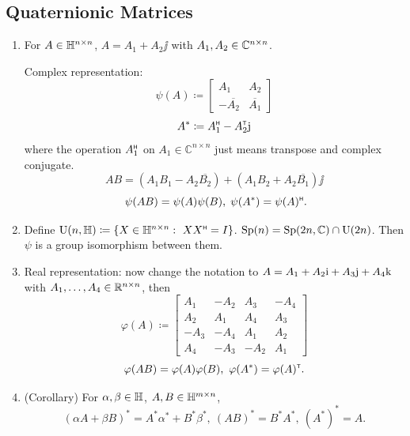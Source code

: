 \subsection{Quaternionic Matrices}
\label{sec:quaternionic-matrices}
\begin{enumerate}
    \item For $A \in \mathbb{H}^{n\times n}$, $A=A_1+A_2\jj$ with $A_1, A_2 \in \mathbb{C}^{n\times n}$.
    
    Complex representation:
        \[ \psi(A) \coloneqq \begin{bmatrix}
        A_1 & A_2 \\ -\overline{A_2} & \overline{A_1}
    \end{bmatrix} \]
        \[ A^* \coloneqq A_1^{\scriptscriptstyle\mathsf{H}} - A_2^{\scriptscriptstyle\mathsf{T}} {\mathrm{j}} \]
    where the operation $A_1^{\scriptscriptstyle\mathsf{H}}$ on $A_1 \in \mathbb{C}^{n\times n}$ just means transpose and complex conjugate.
        \[ AB = (A_1B_1 - A_2 \overline{B_2}) + (A_1B_2 + A_2 \overline{B_1})\jj \]
        \[ \ \psi(AB)=\psi(A) \psi(B), \; \psi(A^*)= \psi(A)^{\scriptscriptstyle\mathsf{H}}. \]
    \item Define $\operatorname{U}(n, \mathbb{H})\coloneqq \{ X \in \mathbb{H}^{n\times n}: \ XX^{\scriptscriptstyle\mathsf{H}}=I \}$. $\operatorname{Sp}(n)=\operatorname{Sp}(2n, \mathbb{C}) \cap \operatorname{U}(2n)$.
    Then $\psi$ is a group isomorphism between them.
    \item Real representation: now change the notation to $A=A_1+A_2{\mathrm{i}}+A_3{\mathrm{j}} + A_4{\mathrm{k}}$ with $A_1,\dots,A_4 \in \mathbb{R}^{n\times n}$, then
    \[ \varphi(A) \coloneqq \begin{bmatrix}
        A_1 & -A_2 & A_3 & -A_4 \\
        A_2 & A_1 & A_4 & A_3 \\
        -A_3 & -A_4 & A_1 & A_2 \\
        A_4 & -A_3 & -A_2 & A_1
    \end{bmatrix} \]
    \[ \varphi(AB) = \varphi(A) \varphi(B),\ \varphi(A^*) = \varphi(A)^\tp. \]
    \item (Corollary) For $\alpha, \beta\in \mathbb{H}$, $A,B\in\mathbb{H}^{m\times n}$, \cite[Definition~3.2.1]{rodman_2014_quaternion}
    \[ (\alpha A +\beta B)^* = A^* \alpha^* + B^* \beta^*,\ (AB)^*=B^* A^*, \ (A^*)^*=A. \]
\end{enumerate}


